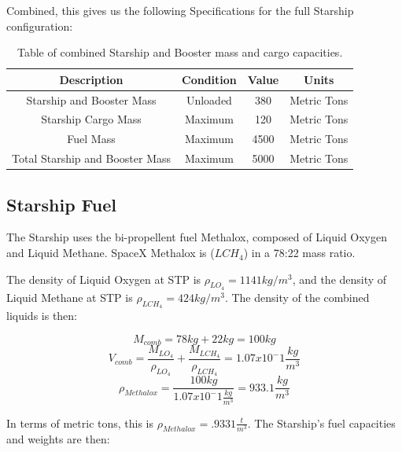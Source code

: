 \documentclass[11pt]{article}
\begin{document}
Combined, this gives us the following Specifications for the full Starship configuration:
\newline

\begin{table}[H]
\begin{center}
\caption{\label{StarshipMassSpecs}Table of combined Starship and Booster mass and cargo capacities.}
\begin{tabular}{||c c c c||} 
 \hline
 Description & Condition & Value & Units \\ [0.5ex]
 \hline\hline
 Starship and Booster Mass & Unloaded & 380 & Metric Tons \\ 
 \hline
 Starship Cargo Mass & Maximum & 120 & Metric Tons \\
 \hline
 Fuel Mass & Maximum & 4500 & Metric Tons \\
 \hline
 Total Starship and Booster Mass & Maximum & 5000 & Metric Tons \\
 \hline
\end{tabular}
\end{center}
\end{table}

\subsection{Starship Fuel}

The Starship uses the bi-propellent fuel Methalox, composed of Liquid Oxygen and Liquid Methane. SpaceX Methalox is ($LCH_4$) in a 78:22 mass ratio. 

  The density of Liquid Oxygen at STP is $\rho_{{LO}_4}=1141 kg/m^3$, and the density of Liquid Methane at STP is $\rho_{{LCH}_4}=424 kg/m^3$.  The density of the combined liquids is then:


\[M_{comb}=78 kg + 22 kg=100 kg\]
\[V_{comb}=\frac{M_{{LO}_4}}{\rho_{{LO}_4}}+\frac{M_{{LCH}_4}}{\rho_{{LCH}_4}}=1.07x10^-1 \frac{kg}{m^3}\]
\[\rho_{Methalox}=\frac{100kg}{1.07x10^-1 \frac{kg}{m^3}}=933.1 \frac{kg}{m^3}\] 
\newline


In terms of metric tons, this is $\rho_{Methalox}=.9331 \frac{t}{m^3}$. The Starship's fuel capacities and weights are then: \newline
\end{document}
